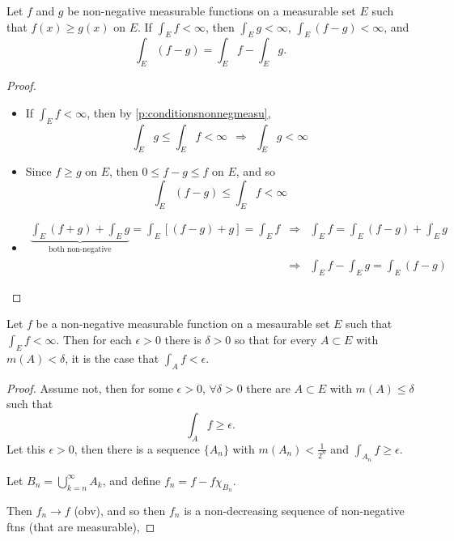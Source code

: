 \begin{pblm}\label{p:nonnegmeas_infty}%
	Let $f$ and $g$ be non-negative measurable functions on a measurable set $E$ such that 
	$f(x) \ge g(x)$ on $E$. If $\int_E f < \infty$, then $\int_E g < \infty$, 
	$\int_E(f-g) < \infty$, and 
	\begin{equation*}
		\int_E(f-g) = \int_Ef - \int_Eg. 
	\end{equation*}
\begin{proof}~
	\begin{itemize}
	\item If $\int_E f < \infty$, then by \ref{p:conditionsnonnegmeasu}, 
		\begin{equation*}
			\int_Eg \le \int_E f < \infty ~~ \Rightarrow ~~ \int_Eg < \infty
		\end{equation*}
	\item Since $f \ge g$ on $E$, then $0 \le f - g \le f$ on $E$, and so 
		\begin{equation*}
			\int_E (f - g) \le \int_E f < \infty
		\end{equation*}
	\item 
		\begin{equation*}
		\begin{array}{rcl}
			\underbrace{\int_E (f + g) + \int_Eg}_{\text{both non-negative}} = 
			\int_E\left[(f - g) + g\right] = \int_Ef & \Rightarrow & \int_Ef = 
			\int_E(f-g)+\int_Eg\\
			& \Rightarrow & \int_Ef - \int_Eg = \int_E(f - g)
		\end{array}
		\end{equation*}
	\end{itemize}
\end{proof}
\end{pblm}

\begin{pblm}%
	Let $f$ be a non-negative measurable function on a mesaurable set $E$ such that 
	$\int_E f < \infty$. Then for each $\epsilon > 0$ there is $\delta > 0$ so that 
	for every $A \subset E$ with $m(A) < \delta$, it is the case that $\int_Af<\epsilon$. 
\begin{proof}
	Assume not, then for some $\epsilon > 0$, $\forall \delta > 0$ there are 
	$A \subset E$ with $m(A) \le \delta$ such that 
	\begin{equation*}
		\int_A f \ge \epsilon.
	\end{equation*}
	Let this $\epsilon > 0$, then there is a sequence $\{A_n\}$ with 
	$m(A_n) < \frac{1}{2^n}$ and $\int_{A_n} f \ge \epsilon$. 

	Let $B_n =\bigcup\limits_{k=n}^\infty A_k$, and define $f_n = f - f\chi_{B_n}$. 

	Then $f_n \rightarrow f$ (obv), and so 
	then $f_n$ is a non-decreasing sequence of non-negative ftns (that are measurable), 

\end{proof}
\end{pblm}

